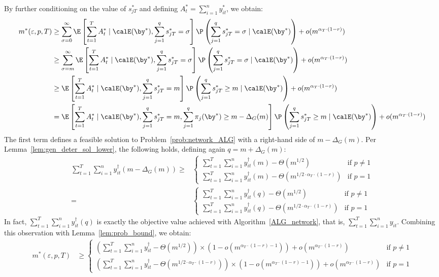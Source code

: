 \documentclass[blindrev]{informs3noheader}
\begin{document}
By further conditioning on the value of $s^*_{jT}$ and defining $A^*_t = \sum_{i=1}^n y^*_{it}$, we obtain:
\begin{align*}
m^*(\varepsilon, p,T)
&\geq\sum_{\sigma=0}^\infty \E\left[\sum_{t=1}^T A^*_t \mid \calE(\by^*), \sum_{j=1}^q s^*_{jT}=\sigma\right]\P\left(\sum_{j=1}^q s^*_{jT}=\sigma \mid \calE(\by^*) \right) + o(m^{\alpha_T\cdot(1-r)})\\
&\geq\sum_{\sigma=m}^\infty \E\left[\sum_{t=1}^T A^*_t \mid \calE(\by^*), \sum_{j=1}^q s^*_{jT}=\sigma\right]\P\left(\sum_{j=1}^q s^*_{jT}=\sigma \mid \calE(\by^*) \right) + o(m^{\alpha_T\cdot(1-r)})\\
&\geq\E\left[\sum_{t=1}^T A^*_t \mid \calE(\by^*), \sum_{j=1}^q s^*_{jT}=m\right]\P\left(\sum_{j=1}^q s^*_{jT}\geq m \mid \calE(\by^*) \right) + o(m^{\alpha_T\cdot(1-r)})\\
&= \E\left[\sum_{t=1}^T A^*_t \mid \calE(\by^*), \sum_{j=1}^q s^*_{jT}=m, \sum_{j=1}^q \pi_{j}(\by^*)\geq m-\Delta_G(m)\right]\P\left(\sum_{j=1}^q s^*_{jT}\geq m\mid \calE(\by^*) \right) + o(m^{\alpha_T\cdot(1-r)})
\end{align*}
The first term defines a feasible solution to Problem~\eqref{prob:network_ALG} with a right-hand side of $m-\Delta_G(m)$. Per Lemma~\ref{lem:gen_deter_sol_lower}, the following holds, defining again $q=m+\Delta_G(m)$:
\begin{align*}
\sum_{t=1}^T \sum_{i=1}^n y_{it}^\dagger\left(m -  \Delta_G(m)\right)
\geq  &\begin{cases}
\sum_{t=1}^T \sum_{i=1}^n y_{it}^\dagger(m)- \Theta(m^{1/2}) & \text{if }p \neq 1\\
\sum_{t=1}^T \sum_{i=1}^n y_{it}^\dagger(m)- \Theta(m^{1/2\cdot \alpha_T\cdot(1-r)}) & \text{if }p =1 
\end{cases}
\\= & \begin{cases}
\sum_{t=1}^T \sum_{i=1}^n y_{it}^\dagger(q)- \Theta(m^{1/2}) & \text{if }p \neq 1\\
\sum_{t=1}^T \sum_{i=1}^n y_{it}^\dagger(q)- \Theta(m^{1/2\cdot \alpha_T\cdot(1-r)}) & \text{if }p =1 
\end{cases}
\end{align*}
In fact, $\sum_{t=1}^T \sum_{i=1}^n y_{it}^\dagger(q)$ is exactly the objective value achieved with Algorithm~\ref{ALG_network}, that is, $\sum_{t=1}^T \sum_{i=1}^n y_{it}$. Combining this observation with Lemma~\ref{lem:prob_bound}, we obtain:
\begin{align*}
m^*(\varepsilon, p,T)
&\geq \begin{cases}
    \left(\sum_{t=1}^T \sum_{i=1}^n y_{it}^\dagger -  \Theta(m^{1/2}) \right) \times \left(1-o\left(m^{\alpha_T\cdot(1-r)-1}\right)\right)+ o(m^{\alpha_T\cdot(1-r)}) & \text{if }p \neq 1\\
    \left(\sum_{t=1}^T \sum_{i=1}^n y_{it}^\dagger -  \Theta(m^{1/2\cdot \alpha_T\cdot(1-r)})\right) \times \left(1-o\left(m^{\alpha_T\cdot(1-r)-1}\right)\right)+ o(m^{\alpha_T\cdot(1-r)}) & \text{if }p =1
\end{cases}
\end{align*}
\end{document}
